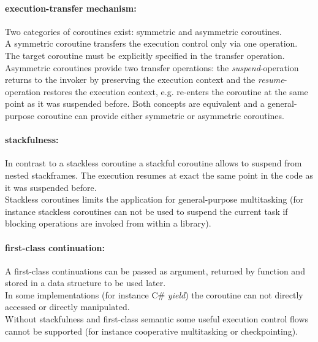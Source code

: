 \paragraph*{execution-transfer mechanism:}
Two categories of coroutines exist: symmetric and asymmetric coroutines.\\
\newline
A symmetric coroutine transfers the execution control only via one operation.
The target coroutine must be explicitly specified in the transfer operation.\\
\newline
Asymmetric coroutines provide two transfer operations:
the \textit{suspend}-operation returns to the invoker by preserving the
execution context  and the \textit{resume}-operation restores the execution
context, e.g. re-enters the coroutine at the same point as it was suspended
before.
Both concepts are equivalent and a general-purpose coroutine can provide either
symmetric or asymmetric coroutines\cite{Moura2009}.

\paragraph*{stackfulness:}
In contrast to a stackless coroutine a stackful coroutine allows to suspend
from nested stackframes. The execution resumes at exact the same point in the
code as it was suspended before.\\
Stackless coroutines limits the application for general-purpose multitasking
\cite{Moura2009} (for instance stackless coroutines can not be used to suspend
the current task if blocking operations are invoked from within a library).

\paragraph*{first-class continuation:}
A first-class continuations can be passed as argument, returned by
function and stored in a data structure to be used later.\\
In some implementations (for instance C\# \textit{yield}) the coroutine can not
directly accessed or directly manipulated.\\
\newline
Without stackfulness and first-class semantic some useful execution control
flows cannot be supported (for instance cooperative multitasking or
checkpointing).
